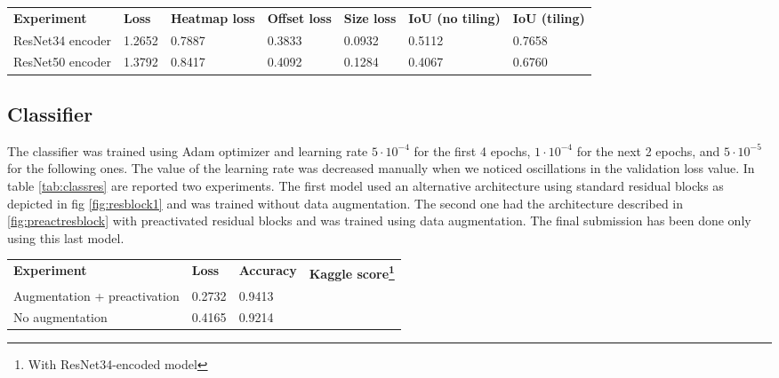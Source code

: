 \begin{table*}[h]
	\begin{tabular}{lllllll}
		\rowcolor[HTML]{EFEFEF} 
		\textbf{Experiment}   & \textbf{Loss} & \textbf{Heatmap loss} & \textbf{Offset loss} & \textbf{Size loss} & \textbf{IoU (no tiling)} & \textbf{IoU (tiling)} \\
		ResNet34 encoder      & 1.2652        & 0.7887                & 0.3833               & 0.0932             & 0.5112                   & 0.7658                \\
		ResNet50 encoder      & 1.3792        & 0.8417                & 0.4092               & 0.1284             & 0.4067                   & 0.6760                   
	\end{tabular}
	\caption{Experiments with two residual architecture for detection. The first one uses ResNet34 for encoding, the second one uses the deeper ResNet50.}
	\label{tab:expdetector}
\end{table*}

\subsection{Classifier}
\label{ssec:classifierexp}

The classifier was trained using Adam optimizer and learning rate $5 \cdot 10^{-4}$ for the first 4 epochs, $1 \cdot 10^{-4}$ for the next 2 epochs, and $5 \cdot 10^{-5}$ for the following ones. The value of the learning rate was decreased manually when we noticed oscillations in the validation loss value. In table \ref{tab:classres} are reported two experiments. The first model used an alternative architecture using standard residual blocks as depicted in fig \ref{fig:resblock1} and was trained without data augmentation. The second one had the architecture described in \ref{fig:preactresblock} with preactivated residual blocks and was trained using data augmentation. The final submission has been done only using this last model.

\begin{table*}[h]
	\begin{minipage}{.7\textwidth}
	\begin{tabular}{llll}
		\rowcolor[HTML]{EFEFEF} 
		\textbf{Experiment} & \textbf{Loss} & \textbf{Accuracy} & \textbf{Kaggle score\footnote{With ResNet34-encoded model}} \\
		Augmentation + preactivation & 0.2732 & 0.9413 &  \\
		No augmentation& 0.4165 & 0.9214 &                    
	\end{tabular}
	\end{minipage}
	\caption{Experiments with classifier with and without data augmentation. First model is trained with pre-activated residual block and data augmentation. The second one is trained with standard residual block and no augmentation.}
	\label{tab:classres}
\end{table*}

